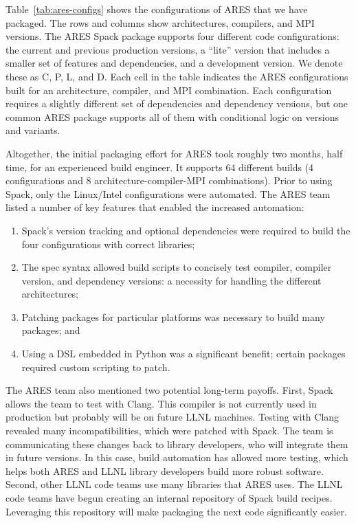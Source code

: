Table~\ref{tab:ares-configs} shows the configurations of ARES that we have packaged.
The rows and columns show architectures, compilers, and MPI versions.
The ARES Spack package supports four different code configurations:
the current and previous production versions, a ``lite'' version that includes
a smaller set of features and dependencies, and a development version.  We 
denote these as C, P, L, and D. Each cell in the table indicates the
ARES configurations built for an architecture, compiler, and MPI combination.
Each configuration requires a slightly different set of dependencies and 
dependency versions, but one common ARES package supports all of them with 
conditional logic on versions and variants.

Altogether, the initial packaging effort for ARES took roughly two months,
half time, for an experienced build engineer. It supports 64 different builds
(4 configurations and 8 architecture-compiler-MPI combinations). Prior to 
using Spack, only the Linux/Intel configurations were automated. The ARES 
team listed a number of key features that enabled the increased automation:
\begin{enumerate}
\item Spack's version tracking and optional dependencies were required to
      build the four configurations with correct libraries;
\item The spec syntax allowed build scripts to concisely test compiler,
      compiler version, and dependency versions: a necessity
      for handling the different architectures;
\item Patching packages for particular platforms was
      necessary to build many packages; and
\item Using a DSL embedded in Python was a significant benefit;
      certain packages required custom scripting to patch.
\end{enumerate}

The ARES team also mentioned two potential long-term payoffs. First, Spack 
allows the team to test with Clang.  This compiler is not currently used in
production but probably will be on future LLNL machines. Testing with Clang 
revealed many incompatibilities, which were patched with Spack. The team is 
communicating these changes back to library developers, who will integrate 
them in future versions. In this case, build automation has allowed more 
testing, which helps both ARES and LLNL library developers build more robust 
software. Second, other LLNL code teams use many libraries that ARES uses.
The LLNL code teams have begun creating an internal repository of Spack 
build recipes.  Leveraging this repository will make packaging the next 
code significantly easier.
